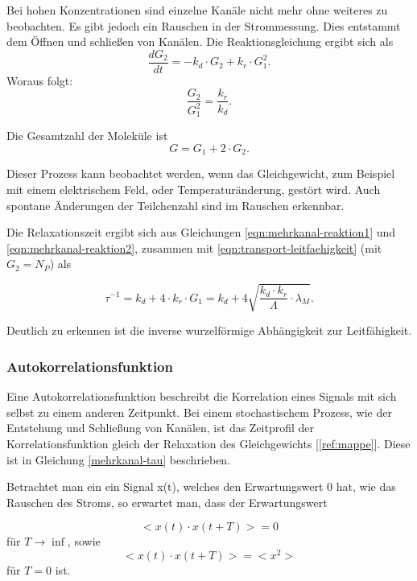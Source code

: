 \documentclass[a4paper,ngerman]{scrartcl}
\begin{document}
Bei hohen Konzentrationen sind einzelne Kanäle nicht mehr ohne weiteres zu beobachten. Es gibt jedoch ein Rauschen in der Strommessung. Dies entstammt dem Öffnen und schließen von Kanälen. 
Die Reaktionsgleichung ergibt sich als
\begin{equation}\label{eqn:mehrkanal-reaktion1}
\frac{dG_2}{dt} = - k_d \cdot G_2 + k_r \cdot G_1^2 .
\end{equation}
Woraus folgt:
\begin{equation}\label{eqn:mehrkanal-reaktion2}
\frac{G_2}{G_1^2} = \frac{k_r}{k_d} .
\end{equation}

Die Gesamtzahl der Moleküle ist
\begin{equation}
G = G_1 + 2 \cdot G_2.
\end{equation}

Dieser Prozess kann beobachtet werden, wenn das Gleichgewicht, zum Beispiel mit einem elektrischem Feld, oder Temperaturänderung, gestört wird. 
Auch spontane Änderungen der Teilchenzahl sind im Rauschen erkennbar.

Die Relaxationszeit ergibt sich aus Gleichungen \ref{eqn:mehrkanal-reaktion1} und \ref{eqn:mehrkanal-reaktion2}, zusammen mit \ref{eqn:transport-leitfaehigkeit} (mit $G_2 = N_P$) als

\begin{equation}\label{mehrkanal-tau}
\tau^{-1} = k_d + 4 \cdot k_r \cdot G_1 = k_d + 4 \sqrt{\frac{k_d \cdot k_r}{\Lambda}  \cdot \lambda_M} .
\end{equation}

Deutlich zu erkennen ist die inverse wurzelförmige Abhängigkeit zur Leitfähigkeit.

\subsubsection{Autokorrelationsfunktion}

Eine Autokorrelationsfunktion beschreibt die Korrelation eines Signals mit sich selbst zu einem anderen Zeitpunkt. 
Bei einem stochastischem Prozess, wie der Entstehung und Schließung von Kanälen, ist das Zeitprofil der Korrelationsfunktion gleich der Relaxation des Gleichgewichts [\ref{ref:mappe}]. Diese ist in Gleichung \ref{mehrkanal-tau} beschrieben.

Betrachtet man ein ein Signal x(t), welches den Erwartungswert 0 hat, wie das Rauschen des Stroms, so erwartet man, dass der Erwartungswert 

\begin{equation}
<x(t) \cdot x(t+T)> = 0
\end{equation}
für $T \rightarrow \inf $, sowie
\begin{equation}
<x(t) \cdot x(t+T)> = <x^2>
\end{equation}
für $T=0$ ist. 
\end{document}
